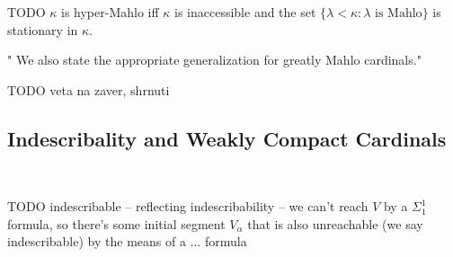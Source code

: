 \documentclass[12pt,a4paper]{article}
\newtheorem{theorem}{Theorem}[section]
\newenvironment{proof}
{\noindent \textit{Proof.}}
{\hspace*{\fill} $\Box$}
\renewcommand{\iff}{\leftrightarrow}
\newcommand{\then}{\rightarrow}
\begin{document}
{\color{red}
\begin{comment}

\begin{theorem}\label{th:refl_mahlo}
$\kappa$ is Mahlo $\iff$ for any $R \subset V_\kappa$ there is an inaccessible cardinal $\alpha < \kappa$ such that $\langle V_\alpha, \in, R \cap V_\alpha \rangle \prec \langle V_\kappa, \in, R \rangle$.
\end{theorem}

\begin{proof}
Start with the proof of (\ref{th:refl_inaccessible}) and add the following:\\
$\kappa$ is Mahlo by the following contradiction. If not, there would be a~$C$ closed unbounded in $\kappa$ containing no inaccessible cardinals. By the hypothesis there is in inaccessible $\alpha < \kappa$ such that $\langle V_\alpha, \in, C \cap V_\alpha \rangle \prec \langle V_\kappa, \in, C \rangle$. By elementarity $C \cap \alpha$ is unbounded in $\alpha$. But then, $\alpha \in C$, which is the contradiction we need.
\end{proof}

\

\end{comment}
}

TODO $\kappa$ is hyper-Mahlo iff $\kappa$ is inaccessible and the set $\{\lambda < \kappa : \lambda\mbox{ is Mahlo}\}$ is stationary in $\kappa$.



" We also state the appropriate generalization for greatly Mahlo cardinals." %

TODO veta na zaver, shrnuti

\subsection{Indescribality and Weakly Compact Cardinals}

\

TODO indescribable -- reflecting indescribability -- we can't reach $V$ by a $\Sigma_1^1$ formula, so there's some initial segment $V_\alpha$ that is also unreachable (we say indescribable) by the means of a ... formula
\end{document}

